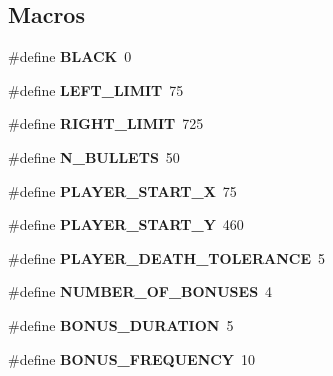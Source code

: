 \subsection*{Macros}
\begin{DoxyCompactItemize}
\item 
\hypertarget{group__player_ga7b3b25cba33b07c303f3060fe41887f6}{}\label{group__player_ga7b3b25cba33b07c303f3060fe41887f6} 
\#define {\bfseries B\+L\+A\+CK}~0
\item 
\hypertarget{group__player_ga393e237f81b072194a8b264849ee3f3e}{}\label{group__player_ga393e237f81b072194a8b264849ee3f3e} 
\#define {\bfseries L\+E\+F\+T\+\_\+\+L\+I\+M\+IT}~75
\item 
\hypertarget{group__player_ga9b15ce2f156a244c94e572735e752843}{}\label{group__player_ga9b15ce2f156a244c94e572735e752843} 
\#define {\bfseries R\+I\+G\+H\+T\+\_\+\+L\+I\+M\+IT}~725
\item 
\hypertarget{group__player_gaaa5bfb702f940c6bae0cf67564d121fb}{}\label{group__player_gaaa5bfb702f940c6bae0cf67564d121fb} 
\#define {\bfseries N\+\_\+\+B\+U\+L\+L\+E\+TS}~50
\item 
\hypertarget{group__player_ga8275f7266c16780e49905fb99a124a7c}{}\label{group__player_ga8275f7266c16780e49905fb99a124a7c} 
\#define {\bfseries P\+L\+A\+Y\+E\+R\+\_\+\+S\+T\+A\+R\+T\+\_\+X}~75
\item 
\hypertarget{group__player_ga736397c33c25b64f9fb0592fb5f6b895}{}\label{group__player_ga736397c33c25b64f9fb0592fb5f6b895} 
\#define {\bfseries P\+L\+A\+Y\+E\+R\+\_\+\+S\+T\+A\+R\+T\+\_\+Y}~460
\item 
\hypertarget{group__player_ga62b023432129aaa5b0aef9d354540ac3}{}\label{group__player_ga62b023432129aaa5b0aef9d354540ac3} 
\#define {\bfseries P\+L\+A\+Y\+E\+R\+\_\+\+D\+E\+A\+T\+H\+\_\+\+T\+O\+L\+E\+R\+A\+N\+CE}~5
\item 
\hypertarget{group__player_gac2e97dd20e2d60043176f4d363dcc544}{}\label{group__player_gac2e97dd20e2d60043176f4d363dcc544} 
\#define {\bfseries N\+U\+M\+B\+E\+R\+\_\+\+O\+F\+\_\+\+B\+O\+N\+U\+S\+ES}~4
\item 
\hypertarget{group__player_ga0d9b068ed7fb4eaaa541f128a1b83e1f}{}\label{group__player_ga0d9b068ed7fb4eaaa541f128a1b83e1f} 
\#define {\bfseries B\+O\+N\+U\+S\+\_\+\+D\+U\+R\+A\+T\+I\+ON}~5
\item 
\hypertarget{group__player_gaedcdf4a40a90351b8171afa24ca2c7fa}{}\label{group__player_gaedcdf4a40a90351b8171afa24ca2c7fa} 
\#define {\bfseries B\+O\+N\+U\+S\+\_\+\+F\+R\+E\+Q\+U\+E\+N\+CY}~10
\end{DoxyCompactItemize}
